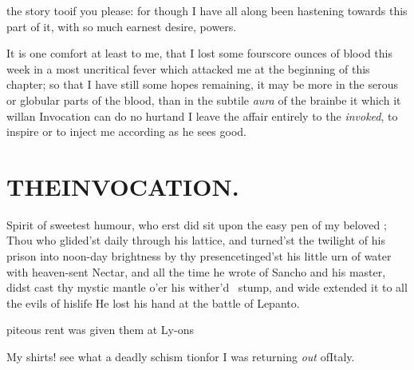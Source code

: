 \documentclass{article}
\begin{document}
 the story too\tsk if you\break
please: for though I have all
along been hastening towards this part of it, with so much earnest desire,
powers.

It is one comfort at least to me, that I lost some fourscore ounces of blood this
week in a most uncritical fever which attacked me at the beginning of this
chapter; so that I have still some hopes remaining, it may be more in the serous or
globular parts of the blood, than in the subtile \textit{aura} of the brain\tsh be
it which it will\tsk an Invocation can do no hurt\tsh and I leave the affair entirely
to the \textit{invoked}, to inspire or to inject me according as he sees good.

\vfill{}\eject\null
\section{{THE\quad INVOCATION}.}


Spirit of sweetest hu\-mour, who erst did sit upon the easy pen of my
beloved ;\break 
Thou who glided’st daily through his lattice, and
turned’st the twilight of his\break
prison into noon-day brightness by thy\break
presence\tsh tinged’st his little urn of\break
water with heaven-sent Nectar, and\break
all the time he wrote of Sancho and his\break
master, didst cast thy mystic mantle\break
o’er his wither’d \fnast\  stump, and wide\break
extended it to all the evils of his\break life\tsh
\vfill
\bgroup\footnotesize
\indent\fnast\enspace He lost his hand at the battle of
Lepanto.\par\egroup
\vfill
{}\eject

\noindent
{}
piteous rent was given them at Ly-\break ons\tsh

My shirts! see what a deadly schism
tion\tsk for I was returning \textit{out} of\break Italy.
\end{document}
